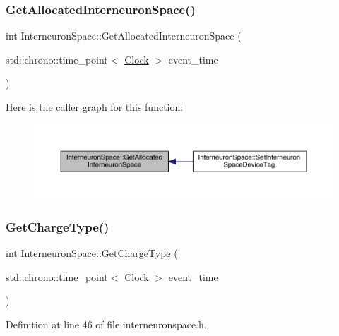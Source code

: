 \subsubsection{\texorpdfstring{Get\+Allocated\+Interneuron\+Space()}{GetAllocatedInterneuronSpace()}}
{\footnotesize\ttfamily int Interneuron\+Space\+::\+Get\+Allocated\+Interneuron\+Space (\begin{DoxyParamCaption}\item[{std\+::chrono\+::time\+\_\+point$<$ \hyperlink{universe_8h_a0ef8d951d1ca5ab3cfaf7ab4c7a6fd80}{Clock} $>$}]{event\+\_\+time }\end{DoxyParamCaption})}

Here is the caller graph for this function\+:\nopagebreak
\begin{figure}[H]
\begin{center}
\leavevmode
\includegraphics[width=350pt]{class_interneuron_space_a4b053dc94a921c8176d9f58d40169089_icgraph}
\end{center}
\end{figure}
\mbox{\label{class_interneuron_space_a90a2c950dd426ed3f015e3c186e877fd}} 
\subsubsection{\texorpdfstring{Get\+Charge\+Type()}{GetChargeType()}}
{\footnotesize\ttfamily int Interneuron\+Space\+::\+Get\+Charge\+Type (\begin{DoxyParamCaption}\item[{std\+::chrono\+::time\+\_\+point$<$ \hyperlink{universe_8h_a0ef8d951d1ca5ab3cfaf7ab4c7a6fd80}{Clock} $>$}]{event\+\_\+time }\end{DoxyParamCaption})\hspace{0.3cm}{\ttfamily [inline]}}



Definition at line 46 of file interneuronspace.\+h.

\mbox{\label{class_interneuron_space_ae62237c3a84893c81e9998602ab16718}} 
